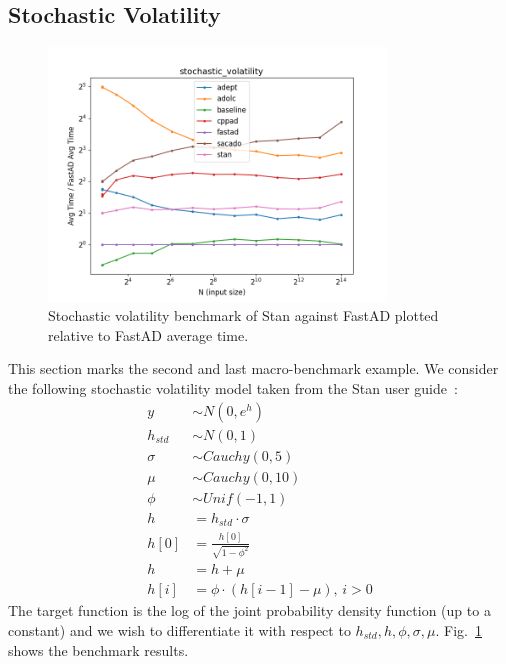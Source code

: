 \subsection{Stochastic Volatility}\label{ssec:stochastic_volatility}

\begin{figure}[t]
    \centering
    \includegraphics[width=0.8\textwidth]{figs/stochastic_volatility_fig.png}
    \caption{%
        Stochastic volatility benchmark of Stan against FastAD 
        plotted relative to FastAD average time.
    }\label{fig:stochastic_volatility}
\end{figure}

This section marks the second and last macro-benchmark example.
We consider the following stochastic volatility model 
taken from the Stan user guide~\cite{stan-rm:2018}:
\begin{align*}
    y &\sim N(0, e^{h}) \\
    h_{std} &\sim N(0, 1) \\
    \sigma &\sim Cauchy(0,5) \\
    \mu &\sim Cauchy(0,10) \\
    \phi &\sim Unif(-1, 1) \\
    h &= h_{std} \cdot \sigma \\
    h[0] &= \frac{h[0]}{\sqrt{1 - \phi^2}} \\
    h &= h + \mu \\
    h[i] &= \phi \cdot (h[i-1] - \mu),\, i > 0
\end{align*}
The target function is the log of the joint probability density function (up to a constant)
and we wish to differentiate it with respect to $h_{std}, h, \phi, \sigma, \mu$.
Fig.~\ref{fig:stochastic_volatility} shows the benchmark results.

